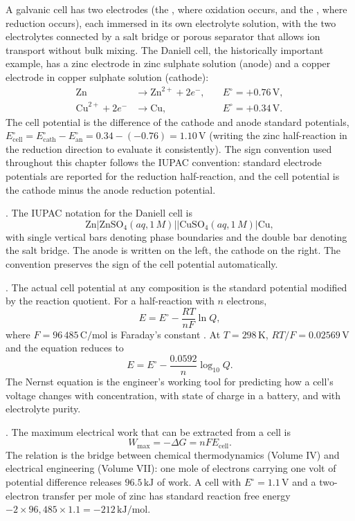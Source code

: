 A galvanic cell has two electrodes (the , where
oxidation occurs, and the , where reduction occurs),
each immersed in its own electrolyte solution, with the two electrolytes
connected by a salt bridge or porous separator that allows ion transport
without bulk mixing. The Daniell cell, the historically important
example, has a zinc electrode in zinc sulphate solution (anode) and a
copper electrode in copper sulphate solution (cathode):
\begin{align*}
\text{Zn} &\to \text{Zn}^{2+} + 2 e^-, \quad &E^\circ = +0.76\,\text{V}, \\
\text{Cu}^{2+} + 2 e^- &\to \text{Cu}, \quad &E^\circ = +0.34\,\text{V}.
\end{align*}
The cell potential is the difference of the cathode and anode standard
potentials, $E^\circ_{\text{cell}} = E^\circ_{\text{cath}} -
E^\circ_{\text{an}} = 0.34 - (-0.76) = 1.10\,\text{V}$ (writing the zinc
half-reaction in the reduction direction to evaluate it consistently).
The sign convention used throughout this chapter follows the IUPAC
convention: standard electrode potentials are reported for the
reduction half-reaction, and the cell potential is the cathode minus
the anode reduction potential.

. The IUPAC notation for the Daniell cell is
\[
\text{Zn}|\text{ZnSO}_4(aq, 1\,M)||\text{CuSO}_4(aq, 1\,M)|\text{Cu},
\]
with single vertical bars denoting phase boundaries and the double
bar denoting the salt bridge. The anode is written on the left, the
cathode on the right. The convention preserves the sign of the cell
potential automatically.

. The actual cell potential at any
composition is the standard potential modified by the reaction
quotient. For a half-reaction with $n$ electrons,
\[
E = E^\circ - \frac{RT}{nF} \ln Q,
\]
where $F = 96\,485\,\text{C}/\text{mol}$ is Faraday's constant
\cite{hist:nernst1889}. At $T = 298\,\si{\kelvin}$, $RT/F = 0.02569\,
\text{V}$ and the equation reduces to
\[
E = E^\circ - \frac{0.0592}{n} \log_{10} Q.
\]
The Nernst equation is the engineer's working tool for predicting how
a cell's voltage changes with concentration, with state of charge in a
battery, and with electrolyte purity.

. The maximum electrical
work that can be extracted from a cell is
\[
W_{\text{max}} = -\Delta G = n F E_{\text{cell}}.
\]
The relation is the bridge between chemical thermodynamics
(Volume IV) and electrical engineering (Volume VII): one mole of
electrons carrying one volt of potential difference releases $96.5\,
\text{kJ}$ of work. A cell with $E^\circ = 1.1\,\text{V}$ and a
two-electron transfer per mole of zinc has standard reaction free
energy $-2 \times 96{,}485 \times 1.1 = -212\,\text{kJ}/\text{mol}$.

